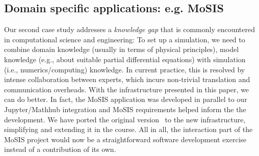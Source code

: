 \subsection{Domain specific applications: e.g. MoSIS}
Our second case study addresses a \emph{knowledge gap} that is commonly encountered in computational science and engineering:
To set up a simulation, we need to combine domain knowledge (usually in terms of physical principles), model knowledge (e.g., about suitable partial differential equations) with simulation (i.e., numerics/computing) knowledge.
In current practice, this is resolved by intense collaboration between experts, which incurs non-trivial translation and communication overheads.
With the infrastructure presented in this paper, we can do better.
In fact, the MoSIS application was developed in parallel to our Jupyter/Mathhub integration and MoSIS requirements helped inform the the development.
We have ported the original version~\cite{PolKohKoe:kacse18} to the new infrastructure, simplifying and extending it in the course.
All in all, the interaction part of the MoSIS project would now be a straightforward software development exercise instead of a contribution of its own. 

